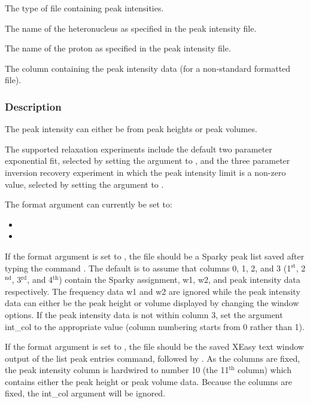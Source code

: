   The type of file containing peak intensities.

  The name of the heteronucleus as specified in the peak intensity file.

  The name of the proton as specified in the peak intensity file.

  The column containing the peak intensity data (for a non-standard formatted file).

\subsubsection{Description}

The peak intensity can either be from peak heights or peak volumes.


The supported relaxation  experiments include the default two parameter exponential fit,
selected by setting the 
 argument to 
, and the three parameter inversion
recovery experiment in which the peak intensity limit  is a non-zero value, selected by
setting the argument to 
.


The format argument can currently be set to:
\begin{itemize}
\item[]     
\item[]     
\end{itemize}

If the format argument is set to 
, the file should be a Sparky  peak list saved after
typing the command 
.  The default is to assume that columns 0, 1, 2, and 3 (1$^\mathrm{st}$, 2$^\mathrm{nd}$,
3$^\mathrm{rd}$, and 4$^\mathrm{th}$) contain the Sparky  assignment, w1, w2, and peak intensity data respectively.
The frequency data w1 and w2 are ignored while the peak intensity data can either be the
peak height or volume displayed  by changing the window options.  If the peak intensity data
is not within column 3, set the argument int\_col to the appropriate value (column numbering
starts from 0 rather than 1).

If the format argument is set to 
, the file should be the saved XEasy text window
output of the list peak entries command, 
 followed by 
.  As the columns are fixed,
the peak intensity column is hardwired to number 10 (the 11$^\mathrm{th}$ column) which contains either
the peak height or peak volume data.  Because the columns are fixed, the int\_col argument
will be ignored.


